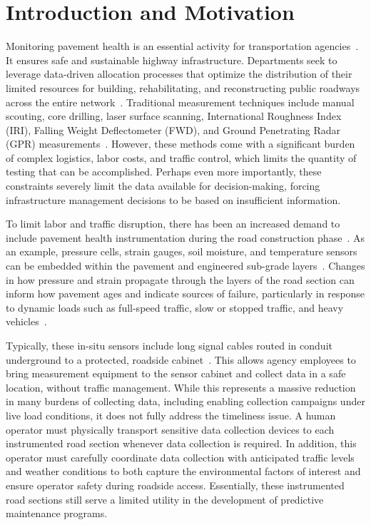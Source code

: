 \documentclass[conference]{IEEEtran}
\begin{document}
\section{Introduction and Motivation}
Monitoring pavement health is an essential activity for transportation agencies~\cite{Barriera2020SituPavementMonitoring}. It ensures safe and sustainable highway infrastructure. Departments seek to leverage data-driven allocation processes that optimize the distribution of their limited resources for building, rehabilitating, and reconstructing public roadways across the entire network~\cite{Jha2023DataDrivenWeb}. Traditional measurement techniques include manual scouting, core drilling, laser surface scanning, International Roughness Index (IRI), Falling Weight Deflectometer (FWD), and Ground Penetrating Radar (GPR) measurements~\cite{Xin2025}. However, these methods come with a significant burden of complex logistics, labor costs, and traffic control, which limits the quantity of testing that can be accomplished. Perhaps even more importantly, these constraints severely limit the data available for decision-making, forcing infrastructure management decisions to be based on insufficient information.

To limit labor and traffic disruption, there has been an increased demand to include pavement health instrumentation during the road construction phase~\cite{Xue2014PavementHealthMonitoring, Alavi2016Continuoushealthmonitoring,Ceylan2016FieldDemo, Micko2023}. As an example, pressure cells, strain gauges, soil moisture, and temperature sensors can be embedded within the pavement and engineered sub-grade layers~\cite{TenorioFilho2023}. Changes in how pressure and strain propagate through the layers of the road section can inform how pavement ages and indicate sources of failure, particularly in response to dynamic loads such as full-speed traffic, slow or stopped traffic, and heavy vehicles~\cite{Heller2023}.

Typically, these in-situ sensors include long signal cables routed in conduit underground to a protected, roadside cabinet~\cite{Liu2024SensorBasedStructural,Ye2024}. This allows agency employees to bring measurement equipment to the sensor cabinet and collect data in a safe location, without traffic management. While this represents a massive reduction in many burdens of collecting data, including enabling collection campaigns under live load conditions, it does not fully address the timeliness issue. A human operator must physically transport sensitive data collection devices to each instrumented road section whenever data collection is required.
In addition, this operator must carefully coordinate data collection with anticipated traffic levels and weather conditions to both capture the environmental factors of interest and ensure operator safety during roadside access. Essentially, these instrumented road sections still serve a limited utility in the development of predictive maintenance programs.
\end{document}
